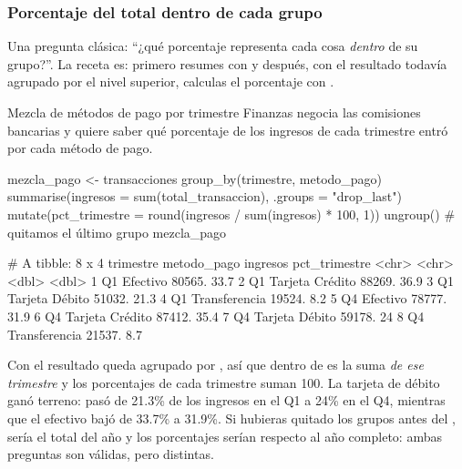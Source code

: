 \subsubsection{Porcentaje del total dentro de cada grupo}

Una pregunta clásica: ``¿qué porcentaje representa cada cosa \emph{dentro}
de su grupo?''. La receta es: primero resumes con  y
después, con el resultado todavía agrupado por el nivel superior, calculas
el porcentaje con .

\begin{ejemplo}{Mezcla de métodos de pago por trimestre}
Finanzas negocia las comisiones bancarias y quiere saber qué porcentaje de
los ingresos de cada trimestre entró por cada método de pago.
\end{ejemplo}

\begin{rcode}
mezcla_pago <- transacciones %
  group_by(trimestre, metodo_pago) %
  summarise(ingresos = sum(total_transaccion),
            .groups = "drop_last") %
  mutate(pct_trimestre = round(ingresos / sum(ingresos) * 100, 1)) %
  ungroup()                               # quitamos el último grupo
mezcla_pago %
\end{rcode}
\begin{rsalida}
# A tibble: 8 x 4
  trimestre metodo_pago     ingresos pct_trimestre
  <chr>     <chr>              <dbl>         <dbl>
1 Q1        Efectivo          80565.          33.7
2 Q1        Tarjeta Crédito   88269.          36.9
3 Q1        Tarjeta Débito    51032.          21.3
4 Q1        Transferencia     19524.           8.2
5 Q4        Efectivo          78777.          31.9
6 Q4        Tarjeta Crédito   87412.          35.4
7 Q4        Tarjeta Débito    59178.          24  
8 Q4        Transferencia     21537.           8.7
\end{rsalida}

Con  el resultado queda agrupado por
, así que  dentro de
 es la suma \emph{de ese trimestre} y los porcentajes de
cada trimestre suman 100. La tarjeta de débito ganó terreno: pasó de
21.3\% de los ingresos en el Q1 a 24\% en el Q4, mientras que el efectivo
bajó de 33.7\% a 31.9\%. Si hubieras quitado los grupos antes del ,
 sería el total del año y los porcentajes serían
respecto al año completo: ambas preguntas son válidas, pero distintas.

